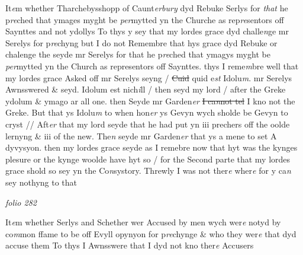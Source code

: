 \documentclass[12pt, a4paper]{book}
\begin{document}
				\marginpar[\vspace{0.5cm}{\textcolor{Gray}{4}}]{}
			
 
		\ifthenelse{\isodd{\thepage}}
		{\reversemarginpar}
		{\normalmarginpar}
		It\textit{e}m whether Tharchebysshopp of Caunt\textit{erbury} dyd Rebuke Serlys for \textit{that} he p\textit{re}ched
that ymages myght be \textit{per}mytted yn the Churche as rep\textit{re}sentors off Saynttes 
and not ydollys
To thys y sey that my lordes grace  dyd challe\textit{n}ge mr Serelys for p\textit{re}chyng but I
do not Remembre that hys grace dyd Rebuke or chalenge the seyde mr Serelys
for that he p\textit{re}ched that ymagys myght be \textit{per}mytted yn the Church as representors off Saynttes. thys I reme\textit{m}bre well that my lordes grace  Asked off mr
Serelys seyng / \sout{Cuid} quid e\textit{st} Idolu\textit{m}. mr Serelys Awnsswered \& seyd. Idolum 
est nich\textit{i}ll / then seyd my lord / after the Greke ydolum \& ymago ar all one. then
Seyde mr Garden\textit{er}
               \sout{I ca\textit{n}not tel} I kno not the Greke. But that ys Idolu\textit{m} to
when hon\textit{er} ys Gevyn wych sholde be Gevyn to cryst // Aft\textit{er }that my lord seyde
that he had put yn iii prechers off the oolde lernyng \& iii of the new. The\textit{n} 
seyde mr Garden\textit{er} that ys a mene to set A dyvysyon. then my lordes grace 
seyde as I remebre now
			 that hyt was the kynges plesure or the kynge woolde have hyt so / for the 
Second parte that my lordes grace  shold so sey yn the Co\textit{n}systory. Threwly I was
not ther\textit{e} wher\textit{e} for y ca\textit{n} sey nothyng to that


\dotfill
						\newpage
{}

\textit{folio 282}


 	
				\marginpar[\vspace{0.5cm}{\textcolor{Gray}{4}}]{}
			

		\ifthenelse{\isodd{\thepage}}
		{\reversemarginpar}
		{\normalmarginpar}
		 It\textit{e}m whether Serlys and Schether wer Accused by men wych wer\textit{e} notyd
by co\textit{m}mon ffame to be off Evyll opynyon for p\textit{re}chynge \& who they wer\textit{e} 
that dyd accuse them
To thys I Awnsswere that I dyd not kno ther\textit{e} Accusers

				\marginpar[\vspace{0.5cm}{\textcolor{Gray}{6}}]{}
			
\end{document}
